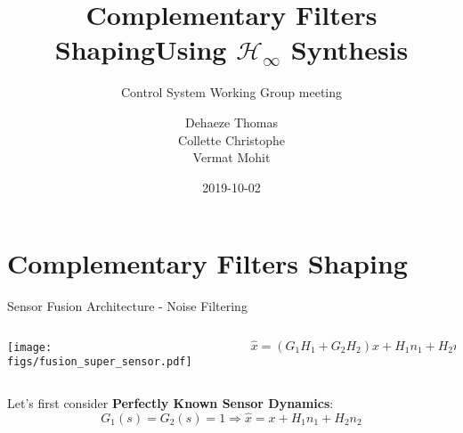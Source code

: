 \documentclass[t]{clean-beamer}
\author{Dehaeze Thomas \\ Collette Christophe \\ Vermat Mohit}
\date{2019-10-02}
\title{Complementary Filters Shaping\newline Using \(\mathcal{H}_\infty\) Synthesis}
\subtitle{Control System Working Group meeting}
\begin{document}
\maketitle

\section{Complementary Filters Shaping}
\label{sec:org15fdac4}
\begin{frame}[label={sec:org236611f}]{Sensor Fusion Architecture - Noise Filtering}
\vspace{-1em}
\begin{columns}
\begin{column}{0.45\columnwidth}
\vspace{-1em}
\begin{center}
\texttt{[image: figs/fusion\_super\_sensor.pdf]}
\end{center}
\end{column}

\begin{column}{0.55\columnwidth}
\begin{equation*}
  \hat{x} = \left(G_1 H_1 + G_2 H_2\right) x + H_1 n_1 + H_2 n_2
\end{equation*}

\vspace{0.5em}
\end{column}
\end{columns}

\vspace{0.5em}
Let's first consider \textbf{Perfectly Known Sensor Dynamics}:
\begin{equation*}
  G_1(s) = G_2(s) = 1 \Longrightarrow \hat{x} = x + H_1 n_1 + H_2 n_2
\end{equation*}

\vspace{0.5em}
\end{frame}
\end{document}
